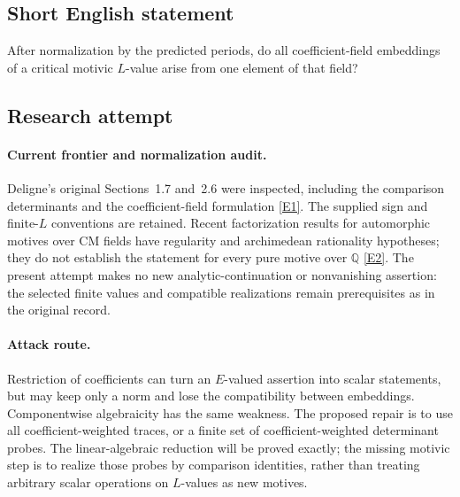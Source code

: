 \documentclass[11pt,a4paper]{article}
\numberwithin{equation}{section}
\newcommand{\Q}{\mathbb{Q}}
\newcommand{\eref}[2]{\hyperlink{extra:#1:#2}{[E#2]}}
\begin{document}
\subsection{Short English statement}
After normalization by the predicted periods, do all coefficient-field embeddings of a critical motivic $L$-value arise from one element of that field?
\subsection{Research attempt}

\paragraph{Current frontier and normalization audit.}
Deligne's original Sections~1.7 and~2.6 were inspected, including the
comparison determinants and the coefficient-field formulation
\eref{71}{1}. The supplied sign and finite-$L$ conventions are retained.
Recent factorization results for automorphic motives over CM fields have
regularity and archimedean rationality hypotheses; they do not establish
the statement for every pure motive over $\Q$ \eref{71}{2}.
The present attempt makes no new analytic-continuation or nonvanishing
assertion: the selected finite values and compatible realizations remain
prerequisites as in the original record.

\paragraph{Attack route.}
Restriction of coefficients can turn an $E$-valued assertion into scalar
statements, but may keep only a norm and lose the compatibility between
embeddings. Componentwise algebraicity has the same weakness. The proposed
repair is to use all coefficient-weighted traces, or a finite set of
coefficient-weighted determinant probes. The linear-algebraic reduction
will be proved exactly; the missing motivic step is to realize those probes
by comparison identities, rather than treating arbitrary scalar operations
on $L$-values as new motives.
\end{document}
